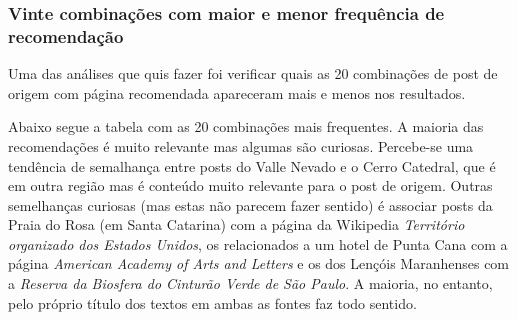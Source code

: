 \subsubsection{Vinte combinações com maior e menor frequência de recomendação}

Uma das análises que quis fazer foi verificar quais as 20 combinações de post de origem com página recomendada apareceram mais e menos nos resultados.

Abaixo segue a tabela com as 20 combinações mais frequentes. A maioria das recomendações é muito relevante mas algumas são curiosas.
Percebe-se uma tendência de semalhança entre posts do Valle Nevado e o Cerro Catedral, que é em outra região mas é conteúdo muito relevante para 
o post de origem. Outras semelhanças curiosas (mas estas não parecem fazer sentido) é associar posts da Praia do Rosa (em Santa Catarina) com 
a página da Wikipedia \textit{Território organizado dos Estados Unidos}, os relacionados a um hotel de Punta Cana com a página 
\textit{American Academy of Arts and Letters} e os dos Lençóis Maranhenses com a \textit{Reserva da Biosfera do Cinturão Verde de São Paulo}. 
A maioria, no entanto, pelo próprio título dos textos em ambas as fontes faz todo sentido.

